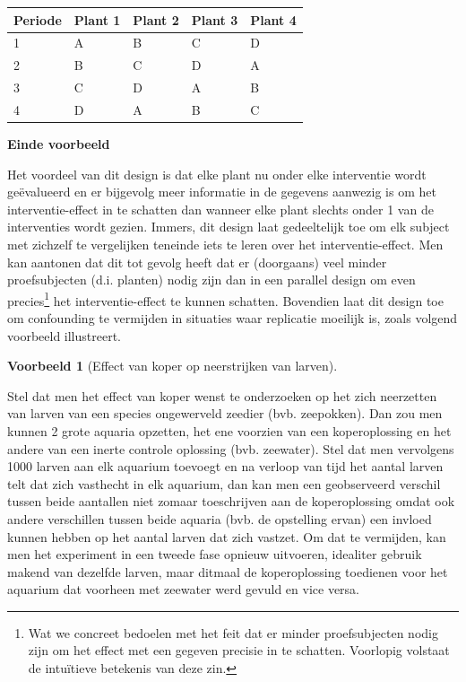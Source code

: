\documentclass[
  12pt,dutch,coursenotes]{book}
\theoremstyle{definition}
\theoremstyle{definition}
\newtheorem{example}{Voorbeeld}[chapter]
\theoremstyle{definition}
\theoremstyle{definition}
\theoremstyle{remark}
\begin{document}
\begin{longtable}[]{@{}lllll@{}}
\toprule
Periode & Plant 1 & Plant 2 & Plant 3 & Plant 4 \\
\midrule
\endhead
1 & A & B & C & D \\
2 & B & C & D & A \\
3 & C & D & A & B \\
4 & D & A & B & C \\
\bottomrule
\end{longtable}

\textbf{Einde voorbeeld}

Het voordeel van dit design is dat elke plant nu onder elke
interventie wordt geëvalueerd en er bijgevolg meer informatie in de
gegevens aanwezig is om het interventie-effect in te schatten dan wanneer
elke plant slechts onder 1 van de interventies wordt gezien. Immers, dit design laat gedeeltelijk toe om elk subject met zichzelf te vergelijken teneinde iets te leren over het interventie-effect. Men kan
aantonen dat dit tot gevolg heeft dat er (doorgaans) veel minder
proefsubjecten (d.i. planten) nodig zijn dan in een parallel design om even precies\footnote{Wat we concreet bedoelen met het feit dat er minder proefsubjecten nodig zijn
  om het effect met een gegeven precisie in te schatten. Voorlopig volstaat de intuïtieve betekenis van deze zin.} het interventie-effect te kunnen
schatten. Bovendien laat dit design toe om confounding te vermijden in situaties waar replicatie moeilijk is, zoals volgend voorbeeld illustreert.

\begin{example}[Effect van koper op neerstrijken van larven]
\protect\hypertarget{exm:unnamed-chunk-77}{}{\label{exm:unnamed-chunk-77} {} }
\end{example}

Stel dat men het effect van koper wenst te onderzoeken op het zich neerzetten van larven van een species ongewerveld zeedier (bvb. zeepokken). Dan zou men kunnen 2 grote aquaria opzetten, het ene voorzien van een koperoplossing en het andere van een inerte controle oplossing (bvb. zeewater). Stel dat men vervolgens 1000 larven aan elk aquarium toevoegt en na verloop van tijd het aantal larven telt dat zich vasthecht in elk aquarium, dan kan men een geobserveerd verschil tussen beide aantallen niet zomaar toeschrijven aan de koperoplossing omdat ook andere verschillen tussen beide aquaria (bvb. de opstelling ervan) een invloed kunnen hebben op het aantal larven dat zich vastzet. Om dat te vermijden, kan men het experiment in een tweede fase opnieuw uitvoeren, idealiter gebruik makend van dezelfde larven, maar ditmaal de koperoplossing toedienen voor het aquarium dat voorheen met zeewater werd gevuld en vice versa.
\end{document}
